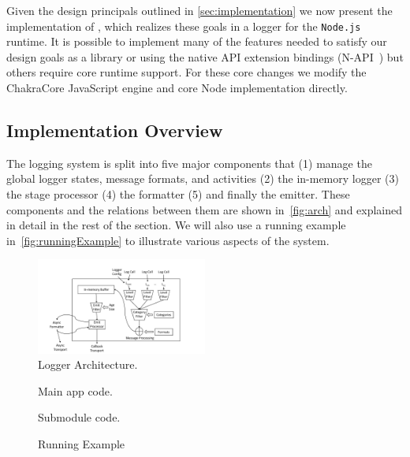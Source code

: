 Given the design principals outlined in \autoref{sec:implementation} we now 
present the implementation of \projn, which realizes these goals in a logger 
for the \texttt{Node.js}~\cite{Node} runtime. It is possible to implement many 
of the features needed to satisfy our design goals as a library or using the 
native API extension bindings (N-API~\cite{NAPI}) but others require core 
runtime support. For these core changes we modify the ChakraCore JavaScript 
engine and core Node implementation directly.

\subsection{Implementation Overview}
The logging system is split into five major components that (1) manage the 
global logger states, message formats, and activities (2) the in-memory logger 
(3) the stage processor (4) the formatter (5) and finally the emitter. These 
components and the relations between them are shown in~\autoref{fig:arch} and 
explained in detail in the rest of the section. We will also use a running 
example in~\autoref{fig:runningExample} to illustrate various aspects of the 
system.

\begin{figure}
    \centering
    \includegraphics[width=0.5\textwidth,angle=-90]{Figures/ArchDiagram}
    \caption{Logger Architecture.}
    \label{fig:arch}
\end{figure}


\begin{figure}[t]
\begin{minipage}[b]{0.5\textwidth}
     
    \caption{Main app code.}
    \label{fig:appmain}
\end{minipage}
\begin{minipage}[b]{0.5\textwidth}
    
    \caption{Submodule code.}
    \label{fig:appsub}
\end{minipage}
\caption{Running Example}
\label{fig:runningExample}
\end{figure}

